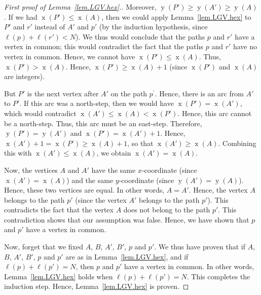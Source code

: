 \documentclass[reqno]{amsart}
\newcommand{\0}{\phantom{c}}
\DeclareMathOperator{\xcoord}{x} %
\DeclareMathOperator{\ycoord}{y} %
\newenvironment{verlong}{}{}
\theoremstyle{plain}
\theoremstyle{definition}
\numberwithin{equation}{section}
\begin{document}
\begin{verlong}
\begin{proof}[First proof of Lemma~\ref{lem.LGV.hex}.]
Moreover, $\ycoord\left(  P'\right)  \geq\ycoord%
\left(  A'\right)  \geq\ycoord\left(  A\right)  $. If we had
$\xcoord\left(  P'\right)  \leq\xcoord\left(
A\right)  $, then we could apply Lemma~\ref{lem.LGV.hex} to $P'$ and
$r'$ instead of $A'$ and $p'$ (by the induction
hypothesis, since $\ell\left(  p\right)  +\ell\left(  r'\right)  <N$).
We thus would conclude that the paths $p$ and $r'$ have a vertex in
common; this would contradict the fact that the paths $p$ and $r'$
have no vertex in common. Hence, we cannot have $\xcoord\left(
P'\right)  \leq\xcoord\left(  A\right)  $. Thus,
$\xcoord\left(  P'\right)  >\xcoord\left(
A\right)  $. Hence, $\xcoord\left(  P'\right)
\geq\xcoord\left(  A\right)  +1$ (since $\xcoord\left(
P'\right)  $ and $\xcoord\left(  A\right)  $ are integers).

But $P'$ is the next vertex after $A'$ on the path $p^{\prime
}$. Hence, there is an arc from $A'$ to $P'$. If this arc was
a north-step, then we would have $\xcoord\left(  P'\right)
=\xcoord\left(  A'\right)  $, which would contradict
$\xcoord\left(  A'\right)  \leq\xcoord\left(
A\right)  <\xcoord\left(  P'\right)  $. Hence, this arc
cannot be a north-step. Thus, this arc must be an east-step. Therefore,
$\ycoord\left(  P'\right)  =\ycoord\left(
A'\right)  $ and $\xcoord\left(  P'\right)
=\xcoord\left(  A'\right)  +1$. Hence, $\xcoord%
\left(  A'\right)  +1=\xcoord\left(  P'\right)
\geq\xcoord\left(  A\right)  +1$, so that $\xcoord\left(
A'\right)  \geq\xcoord\left(  A\right)  $. Combining this
with $\xcoord\left(  A'\right)  \leq\xcoord\left(
A\right)  $, we obtain $\xcoord\left(  A'\right)
=\xcoord\left(  A\right)  $.

Now, the vertices $A$ and $A'$ have the same $x$-coordinate (since
$\xcoord\left(  A'\right)  =\xcoord\left(
A\right)  $) and the same $y$-coordinate (since $\ycoord\left(
A'\right)  =\ycoord\left(  A\right)  $). Hence, these two
vertices are equal. In other words, $A=A'$. Hence, the vertex $A$
belongs to the path $p'$ (since the vertex $A'$ belongs to the
path $p'$). This contradicts the fact that the vertex $A$ does not
belong to the path $p'$. This contradiction shows that our assumption
was false. Hence, we have shown that $p$ and $p'$ have a vertex in common.

Now, forget that we fixed $A$, $B$, $A'$, $B'$, $p$ and
$p'$. We thus have proven that if $A$, $B$, $A'$, $B'%
$, $p$ and $p'$ are as in Lemma~\ref{lem.LGV.hex}, and if $\ell\left(
p\right)  +\ell\left(  p'\right)  =N$, then $p$ and $p'$ have
a vertex in common. In other words, Lemma~\ref{lem.LGV.hex} holds when
$\ell\left(  p\right)  +\ell\left(  p'\right)  =N$. This completes the
induction step. Hence, Lemma~\ref{lem.LGV.hex} is proven.
\end{proof}


\end{verlong}
\end{document}
